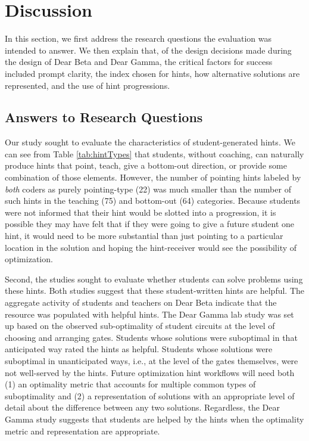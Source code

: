 \section{Discussion}
In this section, we first address the research questions the evaluation was intended to answer. We then explain that, of the design decisions made during the design of Dear Beta and Dear Gamma, the critical factors for success included prompt clarity, the index chosen for hints, how alternative solutions are represented, and the use of hint progressions.

\subsection{Answers to Research Questions}

Our study sought to evaluate the characteristics of student-generated hints. We can see from Table \ref{tab:hintTypes} that students, without coaching, can naturally produce hints that point, teach, give a bottom-out direction, or provide some combination of those elements. However, the number of pointing hints labeled by {\it both} coders as purely pointing-type (22) was much smaller than the number of such hints in the teaching (75) and bottom-out (64) categories. Because students were not informed that their hint would be slotted into a progression, it is possible they may have felt that if they were going to give a future student one hint, it would need to be more substantial than just pointing to a particular location in the solution and hoping the hint-receiver would see the possibility of optimization.

Second, the studies sought to evaluate whether students can solve problems using these hints. Both studies suggest that these student-written hints are helpful. The aggregate activity of students and teachers on Dear Beta indicate that the resource was populated with helpful hints. The Dear Gamma lab study was set up based on the observed sub-optimality of student circuits at the level of choosing and arranging gates. Students whose solutions were suboptimal in that anticipated way rated the hints as helpful. Students whose solutions were suboptimal in unanticipated ways, i.e., at the level of the gates themselves, were not well-served by the hints. Future optimization hint workflows will need both (1) an optimality metric that accounts for multiple common types of suboptimality and (2) a representation of solutions with an appropriate level of detail about the difference between any two solutions. Regardless, the Dear Gamma study suggests that students are helped by the hints when the optimality metric and representation are appropriate.

